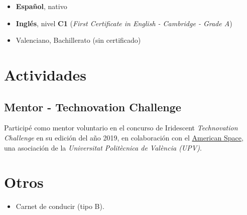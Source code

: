 \documentclass[letterpaper, 12pt, dvipsnames]{article}
\newcommand{\uni}{Universitat Politècnica de València (UPV)}
\newcommand{\fce}{\emph{First Certificate in English - Cambridge - Grade A}}
\begin{document}
    \begin{itemize}
        \item \textbf{Español}, nativo
        \item \textbf{Inglés}, nivel \textbf{C1} (\fce)
        \item Valenciano, Bachillerato (sin certificado)
    \end{itemize}

    \section{Actividades}

    \subsection{Mentor - Technovation Challenge}

    Participé como mentor voluntario en el concurso de Iridescent \emph{Technovation Challenge} en su edición del año 2019, en colaboración con el \href{https://cdl.upv.es/american-space}{American Space}, una asociación de la \emph{\uni}.

    \section{Otros}

    \begin{itemize}
        \item Carnet de conducir (tipo B).
    \end{itemize}
\end{document}
